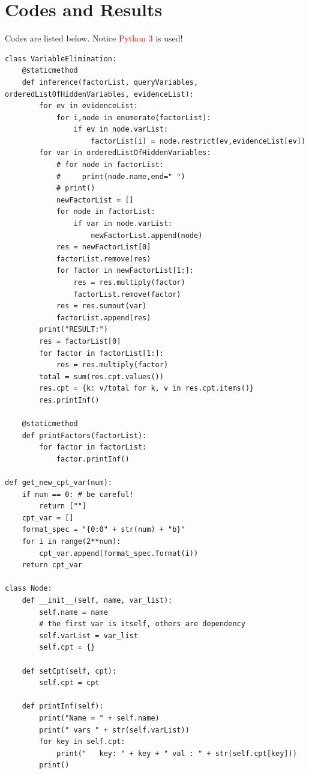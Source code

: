 \documentclass[a4paper, 11pt]{article}
\begin{document}
\section{Codes and Results}
Codes are listed below.
Notice \textcolor{red}{Python 3} is used!
\begin{lstlisting}
class VariableElimination:
    @staticmethod
    def inference(factorList, queryVariables, orderedListOfHiddenVariables, evidenceList):
        for ev in evidenceList:
            for i,node in enumerate(factorList):
                if ev in node.varList:
                    factorList[i] = node.restrict(ev,evidenceList[ev])
        for var in orderedListOfHiddenVariables:
            # for node in factorList:
            #     print(node.name,end=" ")
            # print()
            newFactorList = []
            for node in factorList:
                if var in node.varList:
                    newFactorList.append(node)
            res = newFactorList[0]
            factorList.remove(res)
            for factor in newFactorList[1:]:
                res = res.multiply(factor)
                factorList.remove(factor)
            res = res.sumout(var)
            factorList.append(res)
        print("RESULT:")
        res = factorList[0]
        for factor in factorList[1:]:
            res = res.multiply(factor)
        total = sum(res.cpt.values())
        res.cpt = {k: v/total for k, v in res.cpt.items()}
        res.printInf()

    @staticmethod
    def printFactors(factorList):
        for factor in factorList:
            factor.printInf()

def get_new_cpt_var(num):
    if num == 0: # be careful!
        return [""]
    cpt_var = []
    format_spec = "{0:0" + str(num) + "b}"
    for i in range(2**num):
        cpt_var.append(format_spec.format(i))
    return cpt_var

class Node:
    def __init__(self, name, var_list):
        self.name = name
        # the first var is itself, others are dependency
        self.varList = var_list
        self.cpt = {}

    def setCpt(self, cpt):
        self.cpt = cpt

    def printInf(self):
        print("Name = " + self.name)
        print(" vars " + str(self.varList))
        for key in self.cpt:
            print("   key: " + key + " val : " + str(self.cpt[key]))
        print()


\end{lstlisting}
\end{document}
